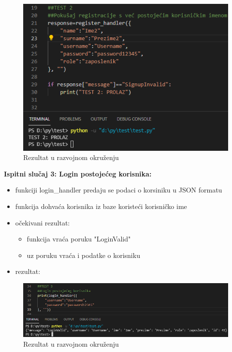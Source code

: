 		\begin{figure}[H]
			\centering
			\includegraphics[scale=0.5]{./slike/rez2.png}
			\caption{Rezultat u razvojnom okruženju}
			\label{fig:REZ2}
		\end{figure}
	
	
		\textbf{Ispitni slučaj 3: Login postojećeg korisnika:}\\
\begin{itemize}
	\item funkciji login\_handler predaju se podaci o korsiniku u JSON formatu
	\item funkcija dohvaća korisnika iz baze koristeći korisničko ime
	
	\item očekivani rezultat:\\
	\begin{itemize}
		\item funkcija vraća poruku "LoginValid" 
		\item uz poruku vraća i podatke o korisniku
	\end{itemize}
	\item rezultat:
\end{itemize}
\begin{figure}[H]
	\centering
	\includegraphics[scale=0.5]{./slike/rez3.png}
	\caption{Rezultat u razvojnom okruženju}
	\label{fig:REZ3}
\end{figure}


